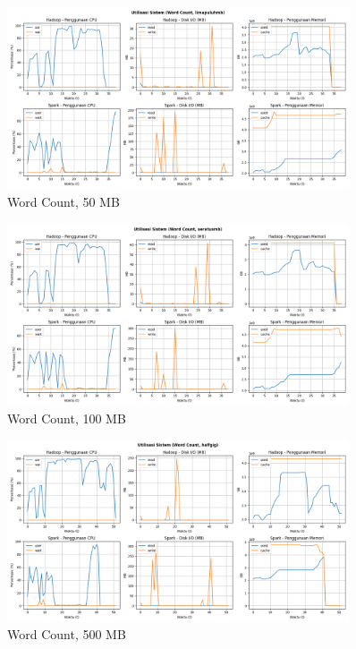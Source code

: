\begin{figure}[h]
    \centering
    \includegraphics[width=0.9\textwidth]{figures/ch04/5-util-sistem-wordcount-limapuluhmb.png}
    \caption*{Word Count, 50 MB}
\end{figure}

\begin{figure}[h]
    \centering
    \includegraphics[width=0.9\textwidth]{figures/ch04/5-util-sistem-wordcount-seratusmb.png}
    \caption*{Word Count, 100 MB}
\end{figure}

\begin{figure}[h]
    \centering
    \includegraphics[width=0.9\textwidth]{figures/ch04/5-util-sistem-wordcount-halfgig.png}
    \caption*{Word Count, 500 MB}
\end{figure}

